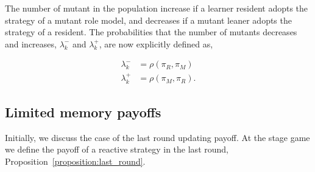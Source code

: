 \documentclass[11pt]{article}
\theoremstyle{plainCl1}
\theoremstyle{plainCl2}
\begin{document}
The number of mutant in the population increase if a learner resident adopts the
strategy of a mutant role model, and decreases if a mutant leaner adopts the
strategy of a resident. The probabilities that the number of mutants decreases
and increases, \(\lambda^-_k\) and \(\lambda^+_k\), are now explicitly defined
as,

\begin{align*} 
  \lambda^-_k &\!=\!\rho(\pi_R, \pi_M) \\
  \lambda^+_k &\!=\!\rho(\pi_M, \pi_R).
\end{align*}

\subsection*{Limited memory payoffs}

Initially, we discuss the case of the last round updating payoff. At the stage
game we define the payoff of a reactive strategy in the last round,
Proposition~\ref{proposition:last_round}.
\end{document}
